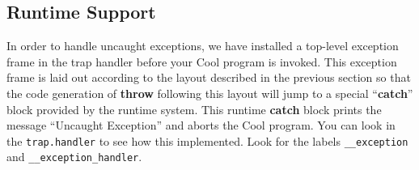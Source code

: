 \documentclass[11pt]{article}
\def\S#1{{\tt{}#1}} %
\def\C#1{{\bf{}#1}}
\newcommand{\Throw}{\C{throw}\xspace}
\newcommand{\Catch}{\C{catch}\xspace}
\begin{document}

%
%


\subsection{Runtime Support}

In order to handle uncaught exceptions, we have installed a top-level
exception frame in the trap handler before your Cool program is
invoked.  This exception frame is laid out according to the layout
described in the previous section so that the code generation of
\Throw following this layout will jump to a special ``\Catch'' block
provided by the runtime system.  This runtime \Catch block prints the
message ``Uncaught Exception'' and aborts the Cool program.  You can
look in the \S{trap.handler} to see how this implemented. Look for the
labels \S{\_\_exception} and \S{\_\_exception\_handler}.
\end{document}
